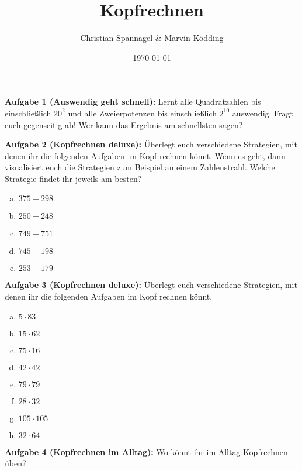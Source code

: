 \documentclass{../cssheet}
\title{Kopfrechnen}
\author{Christian Spannagel \& Marvin Ködding}
\date{\today}
\begin{document}
\printtitle

\textbf{Aufgabe 1 (Auswendig geht schnell):} Lernt alle Quadratzahlen bis einschließlich $20^2$ und alle Zweierpotenzen bis einschließlich $2^10$ auswendig. Fragt euch gegenseitig ab! Wer kann das Ergebnis am schnellsten sagen?


\textbf{Aufgabe 2 (Kopfrechnen deluxe):} 
Überlegt euch verschiedene Strategien, mit denen ihr die folgenden Aufgaben im Kopf rechnen könnt. Wenn es geht, dann visualisiert euch die Strategien zum Beispiel an einem Zahlenstrahl. Welche Strategie findet ihr jeweils am besten?
\begin{enumerate}[a)]
\item $375+298$
\item $250+248$
\item $749+751$
\item $745-198$
\item $253-179$
\end{enumerate}

\textbf{Aufgabe 3 (Kopfrechnen deluxe):} 
Überlegt euch verschiedene Strategien, mit denen ihr die folgenden Aufgaben im Kopf rechnen könnt.
\begin{enumerate}[a)]
\item $5\cdot 83$
\item $15\cdot 62$
\item $75\cdot 16$
\item $42\cdot 42$
\item $79\cdot 79$
\item $28\cdot 32$
\item $105\cdot 105$
\item $32\cdot 64$
\end{enumerate}

\textbf{Aufgabe 4 (Kopfrechnen im Alltag):} 
Wo könnt ihr im Alltag Kopfrechnen üben?

\vspace*{10mm}
\printlicense

\printsocials
\end{document}
